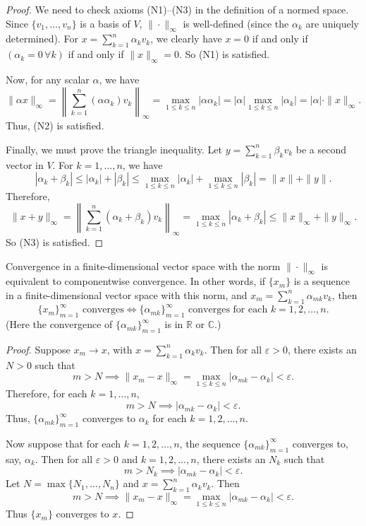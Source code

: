 \begin{proof}
We need to check axioms (N1)--(N3) in the definition of a normed space. Since \(\{v_1, \ldots, v_n\}\) is a basis of \( V \), \( \|\cdot\|_{\infty} \) is well-defined (since the \( \alpha_k \) are uniquely determined). For \( x = \sum_{k=1}^{n} \alpha_k v_k \), we clearly have
\( x = 0 \) if and only if \( (\alpha_k = 0 \, \forall k) \) if and only if \( \|x\|_{\infty} = 0 \). So (N1) is satisfied.

Now, for any scalar \( \alpha \), we have
\[
\|\alpha x\|_{\infty} = \left\| \sum_{k=1}^{n} (\alpha \alpha_k) v_k \right\|_{\infty} = \max_{1 \leq k \leq n} |\alpha \alpha_k| = |\alpha| \max_{1 \leq k \leq n} |\alpha_k| = |\alpha| \cdot \|x\|_{\infty}.
\]
Thus, (N2) is satisfied.

Finally, we must prove the triangle inequality. Let \( y = \sum_{k=1}^{n} \beta_k v_k \) be a second vector in \( V \). For \( k = 1, \ldots, n \), we have
\[
|\alpha_k + \beta_k| \leq |\alpha_k| + |\beta_k| \leq \max_{1 \leq k \leq n} |\alpha_k| + \max_{1 \leq k \leq n} |\beta_k| = \|x\| + \|y\|.
\]
Therefore,
\[
\|x + y\|_{\infty} = \left\| \sum_{k=1}^{n} (\alpha_k + \beta_k) v_k \right\|_{\infty} = \max_{1 \leq k \leq n} |\alpha_k + \beta_k| \leq \|x\|_{\infty} + \|y\|_{\infty}.
\]
So (N3) is satisfied.
\end{proof}


\begin{theorem}
Convergence in a finite-dimensional vector space with the norm \( \|\cdot\|_{\infty} \) is equivalent to componentwise convergence. In other words, if \( \{x_m\} \) is a sequence in a finite-dimensional vector space with this norm, and \( x_m = \sum_{k=1}^{n} \alpha_{mk}v_k \), then
\[
\{x_m\}_{m=1}^{\infty} \text{ converges} \iff \{\alpha_{mk}\}_{m=1}^{\infty} \text{ converges for each } k = 1, 2, \ldots, n.
\]
(Here the convergence of \( \{\alpha_{mk}\}_{m=1}^{\infty} \) is in \( \mathbb{R} \) or \( \mathbb{C} \).)
\end{theorem}

\begin{proof}
Suppose \( x_m \to x \), with \( x = \sum_{k=1}^{n} \alpha_k v_k \). Then for all \( \varepsilon > 0 \), there exists an \( N > 0 \) such that
\[
m > N \implies \|x_m - x\|_{\infty} = \max_{1 \leq k \leq n} |\alpha_{mk} - \alpha_k| < \varepsilon.
\]
Therefore, for each \( k = 1, \ldots, n \),
\[
m > N \implies |\alpha_{mk} - \alpha_k| < \varepsilon.
\]
Thus, \( \{\alpha_{mk}\}_{m=1}^{\infty} \) converges to \( \alpha_k \) for each \( k = 1, 2, \ldots, n \).

Now suppose that for each \( k = 1, 2, \ldots, n \), the sequence \( \{\alpha_{mk}\}_{m=1}^{\infty} \) converges to, say, \( \alpha_k \). Then for all \( \varepsilon > 0 \) and \( k = 1, 2, \ldots, n \), there exists an \( N_k \) such that
\[
m > N_k \implies |\alpha_{mk} - \alpha_k| < \varepsilon.
\]
Let \( N = \max\{N_1, \ldots, N_n\} \) and \( x = \sum_{k=1}^{n} \alpha_k v_k \). Then
\[
m > N \implies \|x_m - x\|_{\infty} = \max_{1 \leq k \leq n} |\alpha_{mk} - \alpha_k| < \varepsilon.
\]
Thus \( \{x_m\} \) converges to \( x \).
\end{proof}